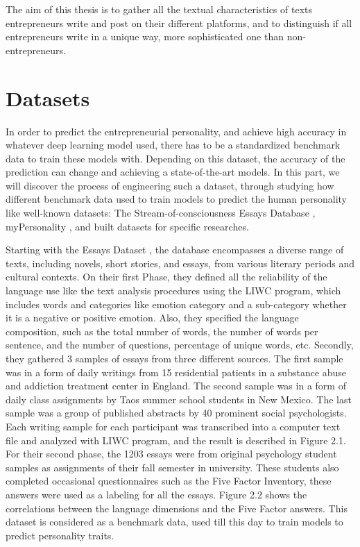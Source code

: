 The aim of this thesis is to gather all the textual characteristics of texts entrepreneurs write and post on their different platforms, and to distinguish if all entrepreneurs write in a unique way, more sophisticated one than non-entrepreneurs.

\section{Datasets}
In order to predict the entrepreneurial personality, and achieve high accuracy in whatever deep learning model used, there has to be a standardized benchmark data to train these models with. Depending on this dataset, the accuracy of the prediction can change and achieving a state-of-the-art models. In this part, we will discover the process of engineering such a dataset, through studying how different benchmark data used to train models to predict the human personality like well-known datasets: The Stream-of-consciousness Essays Database \cite{pennebaker1999linguistic}, myPersonality \cite{kosinski2015facebook}, and built datasets for specific researches.

Starting with the Essays Dataset \cite{pennebaker1999linguistic}, the database encompasses a diverse range of texts, including novels, short stories, and essays, from various literary periods and cultural contexts. On their first Phase, they defined all the reliability of the language use like the text analysis procedures using the LIWC program, which includes words and categories like emotion category and a sub-category whether it is a negative or positive emotion. Also, they specified the language composition, such as the total number of words, the number of words per sentence, and the number of questions, percentage of unique words, etc. Secondly, they gathered 3 samples of essays from three different sources. The first sample was in a form of daily writings from 15 residential patients in a substance abuse and addiction treatment center in England. The second sample was in a form of daily class assignments by Taos summer school students in New Mexico. The last sample was a group of published abstracts by 40 prominent social psychologists. Each writing sample for each participant was transcribed into a computer text file and analyzed with LIWC program, and the result is described in Figure 2.1.\\
For their second phase, the 1203 essays were from original psychology student samples as assignments of their fall semester in university. These students also completed occasional questionnaires such as the Five Factor Inventory, these answers were used as a labeling for all the essays. Figure 2.2 shows the correlations between the language dimensions and the Five Factor answers. This dataset is considered as a benchmark data, used till this day to train models to predict personality traits.


